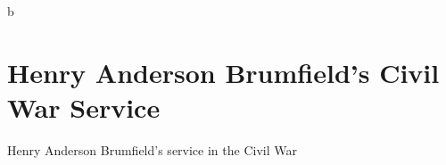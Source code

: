b
\chapter{Henry Anderson Brumfield's Civil War Service}

Henry Anderson Brumfield's service in the Civil War
